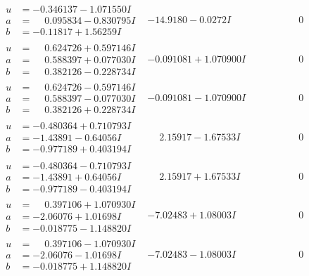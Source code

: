 \documentclass[1p]{elsarticle_modified}
\theoremstyle{definition}
\begin{document}
$$\begin{array}{c|c|c}
\begin{aligned}
u &= -0.346137 - 1.071550 I \\
a &= \phantom{-}0.095834 - 0.830795 I \\
b &= -0.11817 + 1.56259 I\end{aligned}
 & -14.9180 - 0.0272 I & \phantom{-0.000000 } 0 \\ \hline\begin{aligned}
u &= \phantom{-}0.624726 + 0.597146 I \\
a &= \phantom{-}0.588397 + 0.077030 I \\
b &= \phantom{-}0.382126 - 0.228734 I\end{aligned}
 & -0.091081 + 1.070900 I & \phantom{-0.000000 } 0 \\ \hline\begin{aligned}
u &= \phantom{-}0.624726 - 0.597146 I \\
a &= \phantom{-}0.588397 - 0.077030 I \\
b &= \phantom{-}0.382126 + 0.228734 I\end{aligned}
 & -0.091081 - 1.070900 I & \phantom{-0.000000 } 0 \\ \hline\begin{aligned}
u &= -0.480364 + 0.710793 I \\
a &= -1.43891 - 0.64056 I \\
b &= -0.977189 + 0.403194 I\end{aligned}
 & \phantom{-}2.15917 - 1.67533 I & \phantom{-0.000000 } 0 \\ \hline\begin{aligned}
u &= -0.480364 - 0.710793 I \\
a &= -1.43891 + 0.64056 I \\
b &= -0.977189 - 0.403194 I\end{aligned}
 & \phantom{-}2.15917 + 1.67533 I & \phantom{-0.000000 } 0 \\ \hline\begin{aligned}
u &= \phantom{-}0.397106 + 1.070930 I \\
a &= -2.06076 + 1.01698 I \\
b &= -0.018775 - 1.148820 I\end{aligned}
 & -7.02483 + 1.08003 I & \phantom{-0.000000 } 0 \\ \hline\begin{aligned}
u &= \phantom{-}0.397106 - 1.070930 I \\
a &= -2.06076 - 1.01698 I \\
b &= -0.018775 + 1.148820 I\end{aligned}
 & -7.02483 - 1.08003 I & \phantom{-0.000000 } 0 \\ \hline\begin{aligned}

\end{aligned}
\end{array}$$
\end{document}
